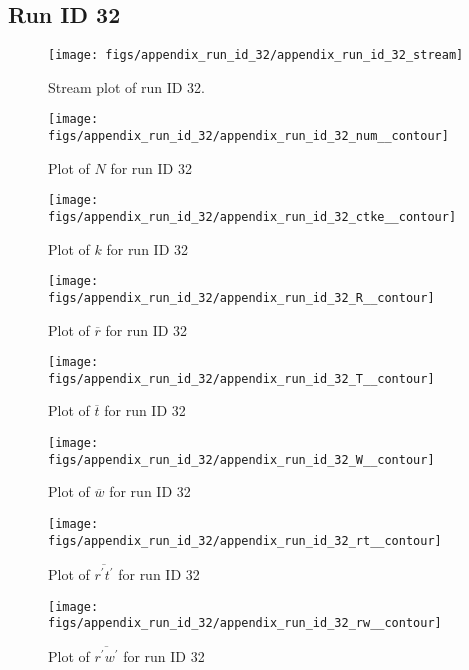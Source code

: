 \subsection{Run ID 32}
\begin{figure}[H]
\centering
\texttt{[image: figs/appendix\_run\_id\_32/appendix\_run\_id\_32\_stream]}
\caption{Stream plot of run ID 32.}
\label{fig:appendix_run_id_32_stream}
\end{figure}


\begin{figure}[H]
\centering
\texttt{[image: figs/appendix\_run\_id\_32/appendix\_run\_id\_32\_num\_\_contour]}
\caption{Plot of $N$ for run ID 32}
\label{fig:appendix_run_id_32_num__contour}
\end{figure}


\begin{figure}[H]
\centering
\texttt{[image: figs/appendix\_run\_id\_32/appendix\_run\_id\_32\_ctke\_\_contour]}
\caption{Plot of $k$ for run ID 32}
\label{fig:appendix_run_id_32_ctke__contour}
\end{figure}


\begin{figure}[H]
\centering
\texttt{[image: figs/appendix\_run\_id\_32/appendix\_run\_id\_32\_R\_\_contour]}
\caption{Plot of $\overline{r}$ for run ID 32}
\label{fig:appendix_run_id_32_R__contour}
\end{figure}


\begin{figure}[H]
\centering
\texttt{[image: figs/appendix\_run\_id\_32/appendix\_run\_id\_32\_T\_\_contour]}
\caption{Plot of $\overline{t}$ for run ID 32}
\label{fig:appendix_run_id_32_T__contour}
\end{figure}


\begin{figure}[H]
\centering
\texttt{[image: figs/appendix\_run\_id\_32/appendix\_run\_id\_32\_W\_\_contour]}
\caption{Plot of $\overline{w}$ for run ID 32}
\label{fig:appendix_run_id_32_W__contour}
\end{figure}


\begin{figure}[H]
\centering
\texttt{[image: figs/appendix\_run\_id\_32/appendix\_run\_id\_32\_rt\_\_contour]}
\caption{Plot of $\overline{r^\prime t^\prime}$ for run ID 32}
\label{fig:appendix_run_id_32_rt__contour}
\end{figure}


\begin{figure}[H]
\centering
\texttt{[image: figs/appendix\_run\_id\_32/appendix\_run\_id\_32\_rw\_\_contour]}
\caption{Plot of $\overline{r^\prime w^\prime}$ for run ID 32}
\label{fig:appendix_run_id_32_rw__contour}
\end{figure}


